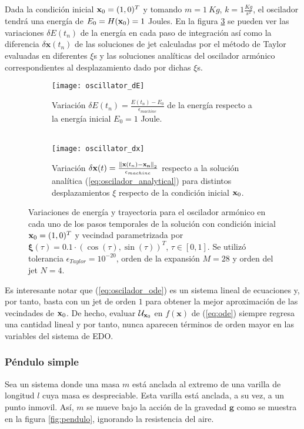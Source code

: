Dada la condición inicial $\mathbf{x}_0 = (1,0)^T$ y tomando $m = 1 \ Kg$, $k = 1 \frac{Kg}{s^2}$, el oscilador tendrá una energía de $E_0 = H(\mathbf{x}_0) = 1$ Joules. En la figura \ref{fig:oscillator_deltas} se pueden ver las variaciones $\delta E(t_n)$ de la energía en cada paso de integración así como la diferencia $\delta \mathbf{x}(t_n)$ de las soluciones de jet calculadas por el método de Taylor evaluadas en diferentes $\xi$s y las soluciones analíticas del oscilador armónico correspondientes al desplazamiento dado por dichas $\xi$s.

 \begin{figure}[h!]
\centering
\begin{subfigure}{0.49\textwidth}
	\centering
	\texttt{[image: oscillator\_dE]}
	\caption{Variación $\delta E(t_n) = \frac{E(t_n)-E_0}{\epsilon_{machine}}$ de la energía respecto a la energía inicial $E_0 = 1$ Joule.\\ \\ }
	\label{fig:oscillator_dE}
\end{subfigure}
%
\begin{subfigure}{0.49\textwidth}
	\centering
	\texttt{[image: oscillator\_dx]}
	\caption{Variación $\delta \mathbf{x}(t) =  \frac{\left\lVert\mathbf{x}(t_n) - \mathbf{x_n}\right\rVert_2}{\epsilon_{machine}}$ respecto a la solución analítica (\ref{eq:oscilador_analytical}) para distintos desplazamientos $\xi$ respecto de la condición inicial $\mathbf{x}_0$.}
	\label{fig:oscillator_dx}
\end{subfigure}
\caption{Variaciones de energía y trayectoria para el oscilador armónico en cada uno de los pasos temporales de la solución con condición inicial $\mathbf{x}_0 = (1,0)^T$ y vecindad parametrizada por  $\mathbf{\xi}(\tau) = 0.1\cdot \left( \cos(\tau), \sin(\tau) \right)^T$, $\tau \in [0,1]$. Se utilizó tolerancia $\epsilon_{Taylor} = 10^{-20}$, orden de la expansión $M = 28$ y orden del jet $N=4$.}
\label{fig:oscillator_deltas}
\end{figure}

Es interesante notar que (\ref{eq:oscilador_ode}) es un sistema lineal de ecuaciones y, por tanto, basta con un jet de orden $1$ para obtener la mejor aproximación de las vecindades de $\mathbf{x}_0$. De hecho, evaluar $\mathcal{U}_{\mathbf{x}_0}$ en $f(\mathbf{x})$ de (\ref{eq:ode}) siempre regresa una cantidad lineal y por tanto, nunca aparecen términos de orden mayor en las variables del sistema de EDO.

\clearpage
\subsubsection{Péndulo simple}
\label{sec:pendulo}
Sea un sistema donde una masa $m$ está anclada al extremo de una varilla de longitud $l$ cuya masa es despreciable. Esta varilla está anclada, a su vez, a un punto inmovil. Así, $m$ se mueve bajo la acción de la gravedad $\mathbf{g}$ como se muestra en la figura \ref{fig:pendulo}, ignorando la resistencia del aire.


